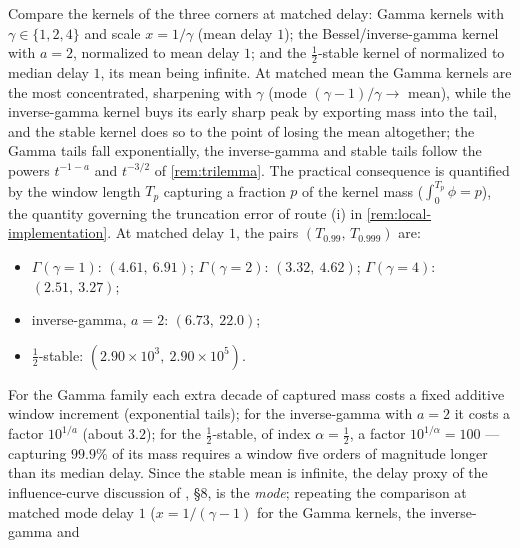 \begin{example}\label{ex:tail-contrast}
Compare the kernels of the three corners at matched delay: Gamma kernels with
$\gamma \in \{1, 2, 4\}$ and scale $x = 1/\gamma$ (mean delay $1$); the Bessel/inverse-gamma
kernel with $a = 2$, normalized to mean delay $1$;
and the $\tfrac12$-stable kernel of  normalized to median
delay $1$, its mean being infinite. At matched mean the Gamma kernels are the most
concentrated, sharpening with $\gamma$ (mode $(\gamma - 1)/\gamma \to$ mean), while the
inverse-gamma kernel buys its early sharp peak by exporting mass into the tail, and the
stable kernel does so to the point of losing the mean altogether; the Gamma tails fall
exponentially, the inverse-gamma and stable tails follow the powers $t^{-1-a}$ and
$t^{-3/2}$ of \ref{rem:trilemma}. The practical consequence is quantified by the
window length $T_p$ capturing a fraction $p$ of the kernel mass ($\int_0^{T_p}\phi = p$),
the quantity governing the truncation error of route (i) in \ref{rem:local-implementation}.
At matched delay $1$, the pairs $(T_{0.99},\, T_{0.999})$ are:
\begin{itemize}
\item $\Gamma(\gamma{=}1)$: $(4.61,\ 6.91)$; $\Gamma(\gamma{=}2)$: $(3.32,\ 4.62)$;
  $\Gamma(\gamma{=}4)$: $(2.51,\ 3.27)$;
\item inverse-gamma, $a = 2$: $(6.73,\ 22.0)$;
\item $\tfrac12$-stable: $(2.90 \times 10^{3},\ 2.90 \times 10^{5})$.
\end{itemize}
For the Gamma family each extra decade of captured mass costs a fixed additive window
increment (exponential tails); for the inverse-gamma with $a = 2$ it costs a factor
$10^{1/a}$ (about $3.2$); for the $\tfrac12$-stable, of index $\alpha = \tfrac12$, a factor
$10^{1/\alpha} = 100$ --- capturing
$99.9\%$ of its mass requires a window five orders of magnitude longer than its median
delay. Since the stable mean is infinite, the delay proxy of the influence-curve discussion
of , \S8, is the \emph{mode}; repeating the comparison at
matched mode delay $1$ ($x = 1/(\gamma-1)$ for the Gamma kernels, the inverse-gamma and

\end{example}
